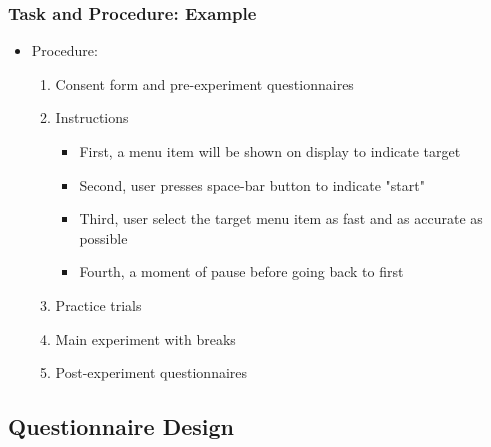 \documentclass{beamer}
\begin{document}
\begin{frame}
	\frametitle{Task and Procedure: Example}
	\begin{itemize}
		\item Procedure:
		\begin{enumerate}
			\item Consent form and pre-experiment questionnaires
			\item Instructions
			\begin{itemize}
				\item First, a menu item will be shown on display to indicate target
				\item Second, user presses space-bar button to indicate "start"
				\item Third, user select the target menu item as fast and as accurate as possible
				\item Fourth, a moment of pause before going back to first
			\end{itemize}
			\item Practice trials
			\item Main experiment with breaks
			\item Post-experiment questionnaires
		\end{enumerate}
	\end{itemize}
\end{frame}



\subsection{Questionnaire Design}
\end{document}
